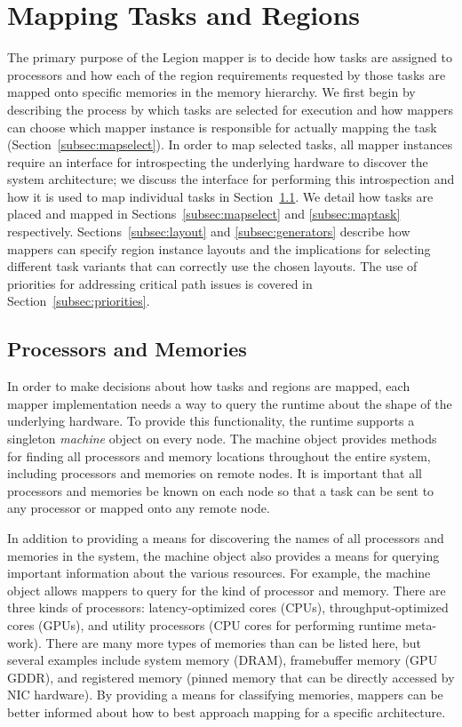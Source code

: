 \section{Mapping Tasks and Regions}
\label{sec:mapbasic}
The primary purpose of the Legion mapper is to decide
how tasks are assigned to processors and how each of 
the region requirements requested by those tasks are
mapped onto specific memories in the memory hierarchy.
We first begin by describing the process by which tasks
are selected for execution and how mappers can choose
which mapper instance is responsible for actually mapping
the task (Section~\ref{subsec:mapselect}). In order to
map selected tasks, all mapper instances require an 
interface for introspecting the underlying hardware to
discover the system architecture; we discuss the
interface for performing this introspection and how it
is used to map individual tasks in 
Section~\ref{subsec:procandmem}. We detail how tasks are
placed and mapped in Sections~\ref{subsec:mapselect} and
\ref{subsec:maptask} respectively.
Sections~\ref{subsec:layout} and \ref{subsec:generators}
describe how mappers can specify region instance layouts
and the implications for selecting different task variants
that can correctly use the chosen layouts. The use of
priorities for addressing critical path issues is covered
in Section~\ref{subsec:priorities}.

\subsection{Processors and Memories}
\label{subsec:procandmem}
In order to make decisions about how tasks and regions
are mapped, each mapper implementation needs a way to
query the runtime about the shape of the underlying 
hardware.  To provide this functionality, the runtime
supports a singleton {\em machine} object on every node.
The machine object provides methods for finding all 
processors and memory locations throughout the entire
system, including processors and memories on remote 
nodes. It is important that all processors and memories
be known on each node so that a task can be sent to any
processor or mapped onto any remote node.

In addition to providing a means for discovering the names
of all processors and memories in the system, the 
machine object also provides a means for querying 
important information about the various resources. For
example, the machine object allows mappers to query for the
kind of processor and memory.  There are three kinds of
processors: latency-optimized cores (CPUs), 
throughput-optimized cores (GPUs), and utility processors
(CPU cores for performing runtime meta-work). There are
many more types of memories than can be listed here, but
several examples include system memory (DRAM), framebuffer 
memory (GPU GDDR), and registered memory (pinned memory 
that can be directly accessed by NIC hardware). By 
providing a means for classifying memories, mappers can 
be better informed about how to
best approach mapping for a specific architecture.

